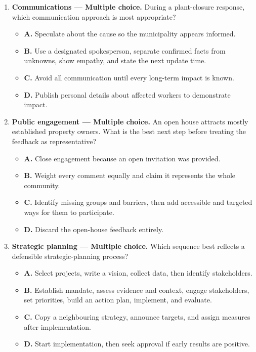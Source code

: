 \documentclass[11pt,letterpaper,oneside,openany]{book}
\begin{document}
\begin{enumerate}[leftmargin=*,itemsep=1.1em]
\begin{itemize}[leftmargin=1.7em]
\end{itemize}
\item \textbf{Communications --- Multiple choice.} During a plant-closure response, which communication approach is most appropriate?
\begin{itemize}[leftmargin=1.7em]
\item \textbf{A.} Speculate about the cause so the municipality appears informed.
\item \textbf{B.} Use a designated spokesperson, separate confirmed facts from unknowns, show empathy, and state the next update time.
\item \textbf{C.} Avoid all communication until every long-term impact is known.
\item \textbf{D.} Publish personal details about affected workers to demonstrate impact.
\end{itemize}
\item \textbf{Public engagement --- Multiple choice.} An open house attracts mostly established property owners. What is the best next step before treating the feedback as representative?
\begin{itemize}[leftmargin=1.7em]
\item \textbf{A.} Close engagement because an open invitation was provided.
\item \textbf{B.} Weight every comment equally and claim it represents the whole community.
\item \textbf{C.} Identify missing groups and barriers, then add accessible and targeted ways for them to participate.
\item \textbf{D.} Discard the open-house feedback entirely.
\end{itemize}
\item \textbf{Strategic planning --- Multiple choice.} Which sequence best reflects a defensible strategic-planning process?
\begin{itemize}[leftmargin=1.7em]
\item \textbf{A.} Select projects, write a vision, collect data, then identify stakeholders.
\item \textbf{B.} Establish mandate, assess evidence and context, engage stakeholders, set priorities, build an action plan, implement, and evaluate.
\item \textbf{C.} Copy a neighbouring strategy, announce targets, and assign measures after implementation.
\item \textbf{D.} Start implementation, then seek approval if early results are positive.

\end{itemize}
\end{enumerate}
\end{document}
